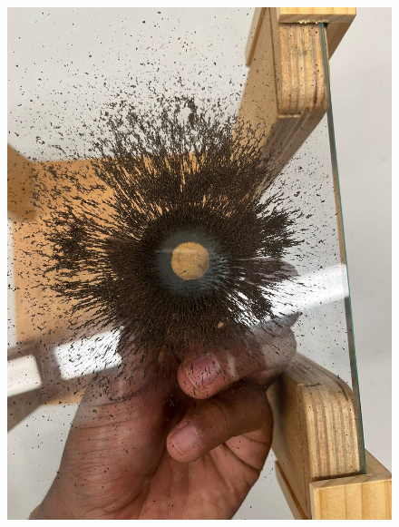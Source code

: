 \begin{figure}[H]
\begin{minipage}{0.45\textwidth}
    \includegraphics[width=\textwidth]{Figures/1. Content/LimadurasHierro1.jpeg}
    \label{fig: Limadura de Hierro 1}
  \end{minipage}
  \hfill
  \begin{minipage}{0.45\textwidth}
    \centering

\end{minipage}
\end{figure}
